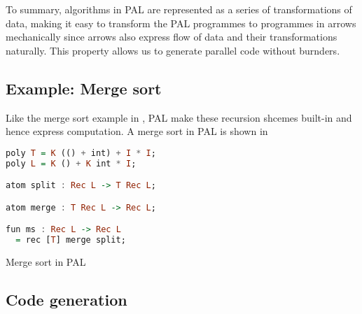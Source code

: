 To summary, algorithms in PAL are represented as a series of transformations of data, making it easy to transform the PAL programmes to programmes in arrows mechanically since arrows also express flow of data and their transformations naturally. This property allows us to generate parallel code without burnders.

\subsection{Example: Merge sort}

Like the merge sort example in , PAL make these recursion shcemes built-in and hence express computation. A merge sort in PAL is shown in 
\begin{code}
\begin{lstlisting}[language=haskell]
poly T = K (() + int) + I * I;
poly L = K () + K int * I;

atom split : Rec L -> T Rec L;

atom merge : T Rec L -> Rec L;

fun ms : Rec L -> Rec L
  = rec [T] merge split;
\end{lstlisting}
\caption{Merge sort in PAL} \label{p:pal:c5}
\end{code}
\subsection{Code generation}